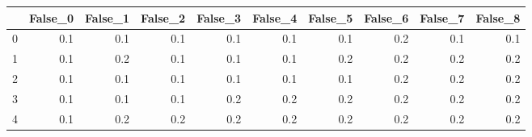 \begin{tabular}{lrrrrrrrrr}
\toprule
{} &  False\_0 &  False\_1 &  False\_2 &  False\_3 &  False\_4 &  False\_5 &  False\_6 &  False\_7 &  False\_8 \\ \hline
\midrule
0 &      0.1 &      0.1 &      0.1 &      0.1 &      0.1 &      0.1 &      0.2 &      0.1 &      0.1 \\ \hline
1 &      0.1 &      0.2 &      0.1 &      0.1 &      0.1 &      0.2 &      0.2 &      0.2 &      0.2 \\ \hline
2 &      0.1 &      0.1 &      0.1 &      0.1 &      0.1 &      0.1 &      0.2 &      0.2 &      0.2 \\ \hline
3 &      0.1 &      0.1 &      0.1 &      0.2 &      0.2 &      0.2 &      0.2 &      0.2 &      0.2 \\ \hline
4 &      0.1 &      0.2 &      0.2 &      0.2 &      0.2 &      0.2 &      0.2 &      0.2 &      0.2 \\ \hline
\bottomrule
\end{tabular}
